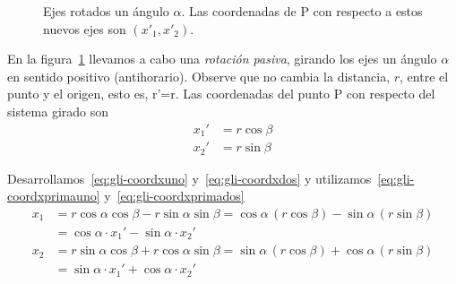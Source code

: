 \begin{figure}[ht]
\begin{minipage}{0.45\linewidth}
    \caption{Ejes rotados un ángulo $\alpha$. Las coordenadas de P con respecto a estos nuevos ejes son $(x'_1,x'_2)$.}
    \label{fig:gli-rotated_axes}
  \end{minipage}
\end{figure}

En la figura~\ref{fig:gli-rotated_axes} llevamos a cabo una \emph{rotación pasiva}\footnotemark{}, girando los ejes un ángulo $\alpha$ en sentido positivo (antihorario).
Observe que no cambia la distancia, $r$, entre el punto y el origen, esto es, r'=r.
Las coordenadas del punto P con respecto del sistema girado son
\begin{subequations}
  \begin{align}\label{eq:gli-coordxprimauno}
    x_1' &= r \cos\beta\\
    \label{eq:gli-coordxprimados}
    x_2' &= r \sin\beta
  \end{align}
\end{subequations}

Desarrollamos~\eqref{eq:gli-coordxuno} y~\eqref{eq:gli-coordxdos} y  utilizamos~\eqref{eq:gli-coordxprimauno} y~\eqref{eq:gli-coordxprimados}
\begin{align*}
  x_1 &= r \cos\alpha \cos\beta - r \sin\alpha \sin\beta
        = \cos\alpha\,(r\cos\beta) - \sin\alpha\,(r\sin\beta)\\
        &= \cos\alpha\cdot x_1' - \sin\alpha \cdot x_2'\\
  x_2 &= r \sin\alpha \cos\beta + r \cos\alpha \sin\beta
        = \sin\alpha\,(r \cos\beta) + \cos\alpha\,(r \sin\beta)\\
        &= \sin\alpha \cdot x_1' + \cos\alpha \cdot x_2'
\end{align*}

